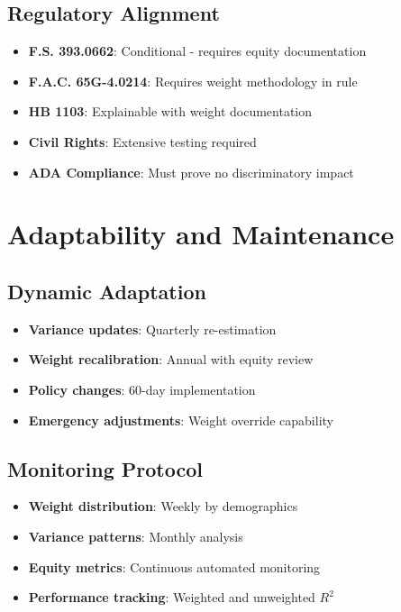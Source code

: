 \subsection{Regulatory Alignment}

\begin{itemize}
    \item[\yellowwarning] \textbf{F.S. 393.0662}: Conditional - requires equity documentation
    \item[\yellowwarning] \textbf{F.A.C. 65G-4.0214}: Requires weight methodology in rule
    \item[\greencheck] \textbf{HB 1103}: Explainable with weight documentation
    \item[\yellowwarning] \textbf{Civil Rights}: Extensive testing required
    \item[\yellowwarning] \textbf{ADA Compliance}: Must prove no discriminatory impact
\end{itemize}

\section{Adaptability and Maintenance}

\subsection{Dynamic Adaptation}

\begin{itemize}
    \item \textbf{Variance updates}: Quarterly re-estimation
    \item \textbf{Weight recalibration}: Annual with equity review
    \item \textbf{Policy changes}: 60-day implementation
    \item \textbf{Emergency adjustments}: Weight override capability
\end{itemize}

\subsection{Monitoring Protocol}

\begin{itemize}
    \item \textbf{Weight distribution}: Weekly by demographics
    \item \textbf{Variance patterns}: Monthly analysis
    \item \textbf{Equity metrics}: Continuous automated monitoring
    \item \textbf{Performance tracking}: Weighted and unweighted $R^2$
\end{itemize}

